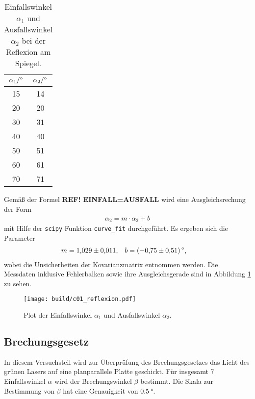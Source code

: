 \begin{table}[H]
    \centering
    \caption[short]{Einfallswinkel $\alpha_1$ und Ausfallswinkel $\alpha_2$ bei der Reflexion am Spiegel.}
    \label{tab:reflexion}
    \begin{tabular}{S S}
        \toprule
        {$\alpha_1 / \unit[]{\degree}$} & {$\alpha_2 / \unit[]{\degree}$} \\
        \midrule
        15 & 14 \\
        20 & 20 \\
        30 & 31 \\
        40 & 40 \\
        50 & 51 \\
        60 & 61 \\
        70 & 71 \\
        \bottomrule
    \end{tabular}
\end{table}

\noindent
Gemäß der Formel \textbf{REF! EINFALL=AUSFALL} wird eine Ausgleichsrechung der Form
\begin{align}
    \alpha_2 = m \cdot \alpha_2 + b
\end{align}
mit Hilfe der \texttt{scipy} \cite[]{scipy} Funktion \texttt{curve\_fit} durchgeführt.
Es ergeben sich die Parameter
\begin{align}
    m &= \num[]{1.029 +- 0.011}, & b &= (\num[]{-0.75 +- 0.51}) \, \unit[]{\degree},
\end{align}
wobei die Unsicherheiten der Kovarianzmatrix entnommen werden.
Die Messdaten inklusive Fehlerbalken sowie ihre Ausgleichsgerade sind in Abbildung \ref{fig:reflexion} zu sehen.

\begin{figure}[H]
    \centering
    \texttt{[image: build/c01\_reflexion.pdf]}
    \caption[]{Plot der Einfallswinkel $\alpha_1$ und Ausfallswinkel $\alpha_2$.}
    \label{fig:reflexion}
\end{figure}






\subsection{Brechungsgesetz}
In diesem Versuchsteil wird zur Überprüfung des Brechungsgesetzes das Licht des grünen Lasers auf eine planparallele Platte geschickt.
Für insgesamt 7 Einfallswinkel $\alpha$ wird der Brechungswinkel $\beta$ bestimmt.
Die Skala zur Bestimmung von $\beta$ hat eine Genauigkeit von $\qty[]{0.5}{\degree}$.